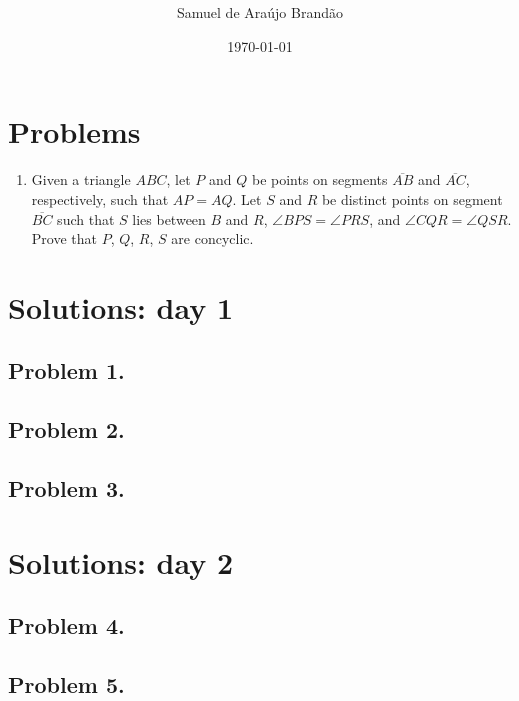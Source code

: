 \documentclass[12pt]{article}
\title{\bfseries\sffamily{USAJMO 2012 Solutions}}
\author{Samuel de Araújo Brandão}
\date{\today}
\begin{document}
  \maketitle

  \tableofcontents
  \clearpage

  \section{\textsf{Problems}}
  \begin{enumerate}[label=\textbf{\arabic*.}]
    \item Given a triangle $ABC$, let $P$ and $Q$ be points on segments $\overline{AB}$ and $\overline{AC}$,
    respectively, such that $AP = AQ$. Let $S$ and $R$ be distinct points on segment $\overline{BC}$
    such that $S$ lies between $B$ and $R$, $\angle BPS = \angle PRS$, and $\angle CQR = \angle QSR$.
    Prove that $P$, $Q$, $R$, $S$ are concyclic.

  \end{enumerate}

  \clearpage

  \section{\textsf{Solutions: day 1}}
    \subsection{Problem 1.}
    \clearpage
    \subsection{Problem 2.}
    \clearpage
    \subsection{Problem 3.}
    \clearpage

  \section{\textsf{Solutions: day 2}}
   \subsection{Problem 4.}
   \clearpage
   \subsection{Problem 5.}
   \clearpage
\end{document}
